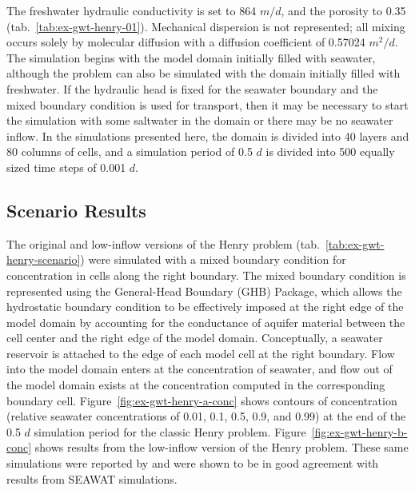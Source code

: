 The freshwater hydraulic conductivity is set to 864 $m/d$, and the porosity to 0.35 (tab.~\ref{tab:ex-gwt-henry-01}).  Mechanical dispersion is not represented; all mixing occurs solely by molecular diffusion with a diffusion coefficient of 0.57024 $m^2/d$. The simulation begins with the model domain initially filled with seawater, although the problem can also be simulated with the domain initially filled with freshwater.  If the hydraulic head is fixed for the seawater boundary and the mixed boundary condition is used for transport, then it may be necessary to start the simulation with some saltwater in the domain or there may be no seawater inflow.  In the simulations presented here, the domain is divided into 40 layers and 80 columns of cells, and a simulation period of 0.5 $d$ is divided into 500 equally sized time steps of 0.001 $d$.



\subsection{Scenario Results}

The original and low-inflow versions of the Henry problem (tab.~\ref{tab:ex-gwt-henry-scenario}) were  simulated with a mixed boundary condition for concentration in cells along the right boundary. The mixed boundary condition is represented using the General-Head Boundary (GHB) Package, which allows the hydrostatic boundary condition to be effectively imposed at the right edge of the model domain by accounting for the conductance of aquifer material between the cell center and the right edge of the model domain. Conceptually, a seawater reservoir is attached to the edge of each model cell at the right boundary. Flow into the model domain enters at the concentration of seawater, and flow out of the model domain exists at the concentration computed in the corresponding boundary cell. Figure~\ref{fig:ex-gwt-henry-a-conc} shows contours of concentration (relative seawater concentrations of 0.01, 0.1, 0.5, 0.9, and 0.99) at the end of the 0.5 $d$ simulation period for the classic Henry problem.  Figure~\ref{fig:ex-gwt-henry-b-conc} shows results from the low-inflow version of the Henry problem.  These same simulations were reported by \cite{langevin2020hydraulic} and were shown to be in good agreement with results from SEAWAT simulations.

